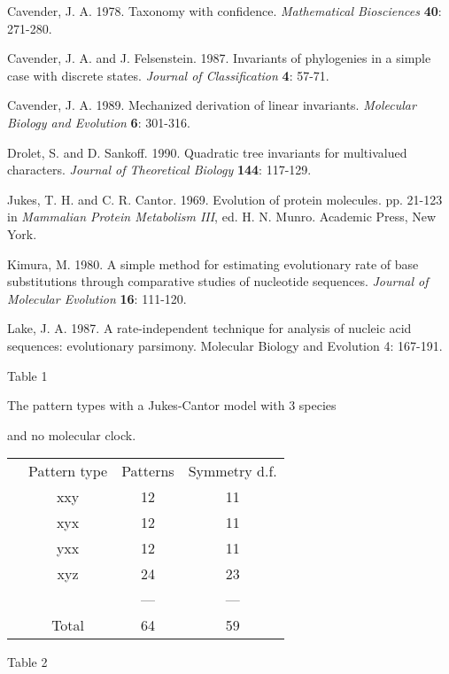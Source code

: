 Cavender, J. A.  1978.  Taxonomy with confidence. {\it Mathematical Biosciences}
{\bf 40}: 271-280.
\medskip

Cavender, J. A.  and J. Felsenstein.  1987.  Invariants of phylogenies
in a simple case with discrete states.  {\it Journal of Classification}
{\bf 4}: 57-71.
\medskip

Cavender, J. A.  1989.  Mechanized derivation of linear invariants.
{\it Molecular Biology and Evolution}  {\bf 6}: 301-316.
\medskip

Drolet, S. and D. Sankoff.  1990.  Quadratic tree invariants for
multivalued characters.  {\it Journal of Theoretical Biology} {\bf 144}:
117-129.
\medskip

Jukes, T. H. and C. R. Cantor. 1969. Evolution of protein molecules.
pp. 21-123 in {\it Mammalian Protein Metabolism III}, ed. H. N. Munro.
Academic Press, New York.
\medskip

Kimura, M.  1980.  A simple method for estimating evolutionary rate of
base substitutions through comparative studies of nucleotide sequences.
{\it Journal of Molecular Evolution} {\bf 16}: 111-120.
\medskip

Lake, J. A.  1987.  A rate-independent technique for analysis of nucleic
acid sequences: evolutionary parsimony.  Molecular Biology and Evolution
4: 167-191.
\medskip

\newpage

\centerline{Table 1}

\centerline{The pattern types with a Jukes-Cantor model with 3 species}
\centerline{and no molecular clock.}
\bigskip

\begin{tabular}{c c c c}
\medskip
               & Pattern type &   Patterns  &   Symmetry d.f.\\
                   & xxy     &      12      &       11\\
                   & xyx     &      12      &       11\\
                   & yxx     &      12      &       11\\
                   & xyz     &      24      &       23\\
                           & &     ---      &      ---\\
                    & Total   &     64       &      59
\end{tabular}

\newpage

\centerline{Table 2}

